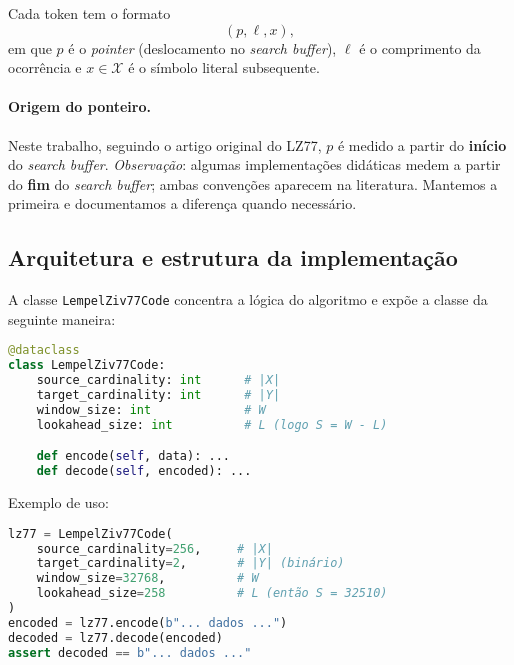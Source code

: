 Cada token tem o formato
\[
    (p,\ell,x),
\]
em que \(p\) é o \textit{pointer} (deslocamento no \emph{search buffer}),
\(\ell\) é o comprimento da ocorrência e \(x\in \mathcal{X}\) é o símbolo
literal subsequente.

\paragraph*{Origem do ponteiro.}
Neste trabalho, seguindo o artigo original do LZ77, \(p\) é medido a partir do \textbf{início} do \emph{search buffer}. \emph{Observação}: algumas implementações didáticas medem a partir do \textbf{fim} do \emph{search buffer}; ambas convenções aparecem na literatura. Mantemos a primeira e documentamos a diferença quando necessário.

\subsection{Arquitetura e estrutura da implementação}

A classe \texttt{LempelZiv77Code} concentra a lógica do algoritmo e expõe a classe da seguinte maneira:
\begin{lstlisting}[language=Python, caption={Estrutura simplificada da classe LZ77}]
@dataclass
class LempelZiv77Code:
    source_cardinality: int      # |X|
    target_cardinality: int      # |Y|
    window_size: int             # W
    lookahead_size: int          # L (logo S = W - L)

    def encode(self, data): ...
    def decode(self, encoded): ...
\end{lstlisting}

Exemplo de uso:
\begin{lstlisting}[language=Python, caption={Uso típico do LZ77 na \textit{Komm}}]
lz77 = LempelZiv77Code(
    source_cardinality=256,     # |X|
    target_cardinality=2,       # |Y| (binário)
    window_size=32768,          # W
    lookahead_size=258          # L (então S = 32510)
)
encoded = lz77.encode(b"... dados ...")
decoded = lz77.decode(encoded)
assert decoded == b"... dados ..."
\end{lstlisting}


